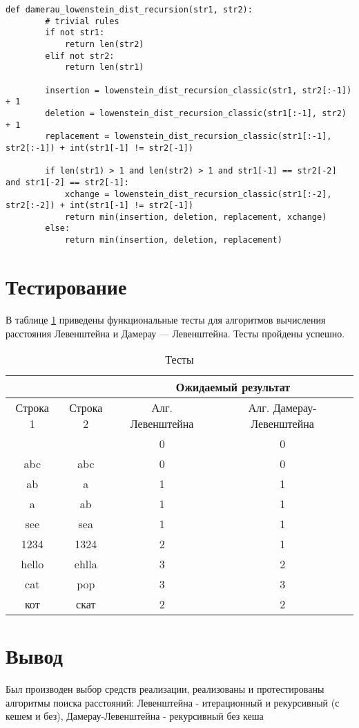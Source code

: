 \begin{lstlisting}[caption=Функция рекурсивного алгоритма поиска расстояния Дамерау-Левенштейна,
	label={dlev_recursion}]
	def damerau_lowenstein_dist_recursion(str1, str2):
		# trivial rules
		if not str1:
			return len(str2)
		elif not str2:
			return len(str1)
		
		insertion = lowenstein_dist_recursion_classic(str1, str2[:-1]) + 1
		deletion = lowenstein_dist_recursion_classic(str1[:-1], str2) + 1
		replacement = lowenstein_dist_recursion_classic(str1[:-1], str2[:-1]) + int(str1[-1] != str2[-1])
		
		if len(str1) > 1 and len(str2) > 1 and str1[-1] == str2[-2] and str1[-2] == str2[-1]:
			xchange = lowenstein_dist_recursion_classic(str1[:-2], str2[:-2]) + int(str1[-1] != str2[-1])
			return min(insertion, deletion, replacement, xchange)
		else:
			return min(insertion, deletion, replacement)
\end{lstlisting}

\section{Тестирование}

В таблице \ref{test} приведены функциональные тесты для алгоритмов вычисления расстояния Левенштейна и Дамерау — Левенштейна. Тесты пройдены успешно.

\begin{table}[h]
	\begin{center}
		\caption{\label{test} Тесты}
		\begin{tabular}{|c|c|c|c|}
			\hline
			&                    & \multicolumn{2}{c|}{\bfseries Ожидаемый результат}    \\ \cline{3-4}\hline
			Строка 1& Строка 2 & Алг. Левенштейна & Алг. Дамерау-Левенштейна \\ [0.5ex] 
			\hline
			 &  & 0 & 0\\
			\hline
			abc & abc & 0 & 0\\
			\hline
			ab & a & 1 & 1\\
			\hline
			a & ab & 1 & 1\\
			\hline
			see & sea & 1 & 1\\
			\hline
			1234 & 1324 & 2 & 1\\
			\hline
			hello & ehlla & 3 & 2\\
			\hline
			cat & pop & 3 & 3\\
			\hline
			кот & скат & 2 & 2\\
			\hline
		\end{tabular}
	\end{center}
\end{table}


\section*{Вывод}

Был производен выбор средств реализации, реализованы и протестированы алгоритмы поиска расстояний: Левенштейна - итерационный и рекурсивный (с кешем и без), Дамерау-Левенштейна - рекурсивный без кеша
